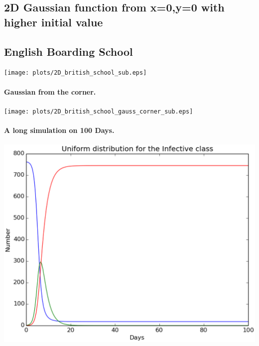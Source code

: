 \documentclass[%
twoside,                 %
final,                   %
10pt]{article}
\begin{document}
\subsection{2D Gaussian function from x=0,y=0 with higher initial value}

\subsection{English Boarding School}


\begin{center}  %
  \centerline{\texttt{[image: plots/2D\_british\_school\_sub.eps]}}
\end{center}


\paragraph{Gaussian from the corner.}
\begin{center}  %
  \centerline{\texttt{[image: plots/2D\_british\_school\_gauss\_corner\_sub.eps]}}
\end{center}


\paragraph{A long simulation on 100 Days.}
\begin{center}  %
  \centerline{\includegraphics[width=0.8\linewidth]{plots/2D_british_school_long_number.eps}}
\end{center}
\end{document}
